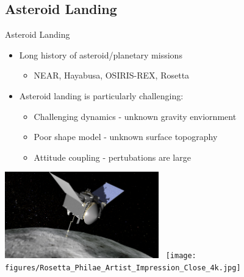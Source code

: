 \documentclass[11pt,professionalfonts]{beamer}
\begin{document}
\subsection[Landing]{Asteroid Landing}  
\begin{frame}{Asteroid Landing}
    \begin{itemize}
        \item Long history of asteroid/planetary missions
            \begin{itemize}
                \item NEAR, Hayabusa, OSIRIS-REX, Rosetta
            \end{itemize}
            \pause
        \item Asteroid landing is particularly challenging:
            \begin{itemize}
                \item<2-> Challenging dynamics - unknown gravity enviornment
                \item<2-> Poor shape model - unknown surface topography
                \item<2-> Attitude coupling - pertubations are large 
            \end{itemize}
    \end{itemize}
    \begin{center}
        \includegraphics[width=0.5\textwidth,height=0.3\textheight,keepaspectratio]{figures/osiris_rex.png}~
        \texttt{[image: figures/Rosetta\_Philae\_Artist\_Impression\_Close\_4k.jpg]}
    \end{center} 
\end{frame}
\end{document}
